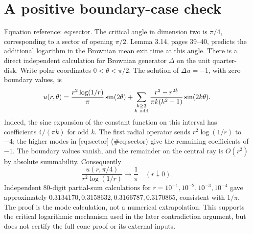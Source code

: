 \documentclass[10pt]{article}
\begin{document}
\section*{A positive boundary-case check}
Equation reference: eq:sector. The critical angle in dimension two is \(\pi/4\), corresponding to a sector of opening \(\pi/2\). Lemma 3.14, pages 39–40, predicts the additional logarithm in the Brownian mean exit time at this angle. There is a direct independent calculation for Brownian generator \(\Delta\) on the unit quarter-disk. Write polar coordinates \(0<\theta<\pi/2\). The solution of \(\Delta u=-1\), with zero boundary values, is \[
 u(r,\theta)=\frac{r^2\log(1/r)}{\pi}\sin(2\theta)
 +\sum_{\substack{k\geq3\\k\ {\rm odd}}}
 \frac{r^2-r^{2k}}{\pi k(k^2-1)}\sin(2k\theta).\] Indeed, the sine expansion of the constant function on this interval has coefficients \(4/(\pi k)\) for odd \(k\). The first radial operator sends \(r^2\log(1/r)\) to \(-4\); the higher modes in [eq:sector] (\#eq:sector) give the remaining coefficients of \(-1\). The boundary values vanish, and the remainder on the central ray is \(O(r^2)\) by absolute summability. Consequently \[\frac{u(r,\pi/4)}{r^2\log(1/r)}\longrightarrow\frac1\pi
 \quad(r\downarrow0).\] Independent 80-digit partial-sum calculations for \(r=10^{-1},10^{-2},
10^{-3},10^{-4}\) gave approximately \(0.3134170,0.3158632,0.3166787,
0.3170865\), consistent with \(1/\pi\). The proof is the mode calculation, not a numerical extrapolation. This supports the critical logarithmic mechanism used in the later contradiction argument, but does not certify the full cone proof or its external inputs.\par
\end{document}
